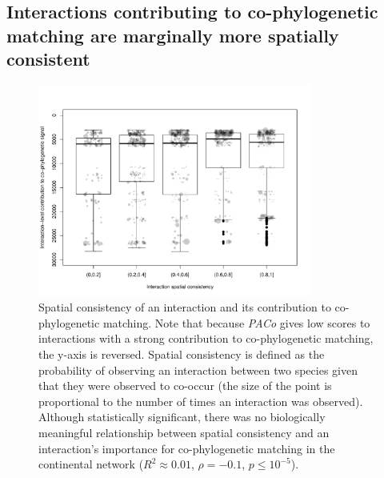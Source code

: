 \documentclass[11pt,serif]{article}
\begin{document}
\subsection{Interactions contributing to co-phylogenetic matching are
marginally more spatially
consistent}\label{interactions-contributing-to-co-phylogenetic-matching-are-marginally-more-spatially-consistent}

\begin{figure}[htbp]
\centering
\includegraphics[width=0.80000\textwidth]{figure/consistency-1.pdf}
\caption{Spatial consistency of an interaction and its contribution to
co-phylogenetic matching. Note that because \emph{PACo} gives low scores
to interactions with a strong contribution to co-phylogenetic matching,
the y-axis is reversed. Spatial consistency is defined as the
probability of observing an interaction between two species given that
they were observed to co-occur (the size of the point is proportional to
the number of times an interaction was observed). Although statistically
significant, there was no biologically meaningful relationship between
spatial consistency and an interaction's importance for co-phylogenetic
matching in the continental network (\(R^2 \approx 0.01\),
\(\rho = -0.1\), \(p \leq 10^{-5}\)).\label{fig:consistency}}
\end{figure}
\end{document}
